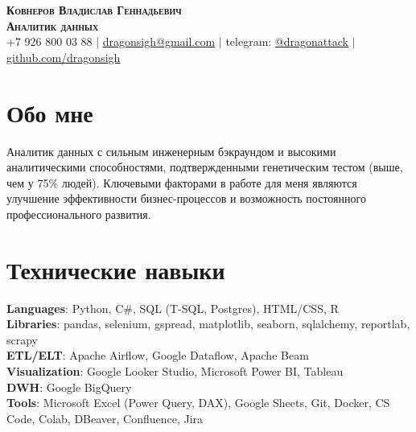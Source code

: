 \documentclass[letterpaper,11pt]{article}
\begin{document}

\begin{center}
    \textbf{\Large \scshape Ковнеров Владислав Геннадьевич} \\ \vspace{1pt}
    \textbf{\scshape Аналитик данных} \\ \vspace{1pt}
    \small +7 926 800 03 88 $|$ \href{mailto:dragonsigh@gmail.com}{\underline{dragonsigh@gmail.com}} $|$ 
    telegram: \href{https://t.me/dragonattack}{\underline{@dragonattack}} $|$
    \href{https://github.com/DragonSigh}{\underline{github.com/dragonsigh}}
\end{center}


 \section{Обо мне}
 \begin{itemize}[leftmargin=0.15in, label={}]
    \small{\item{
     {Аналитик данных с сильным инженерным бэкраундом и высокими аналитическими способностями, подтвержденными генетическим тестом (выше, чем у 75\% людей). Ключевыми факторами в работе для меня являются улучшение эффективности бизнес-процессов и возможность постоянного профессионального развития.}
    }}
 \end{itemize}


\section{Технические навыки}
 \begin{itemize}[leftmargin=0.15in, label={}]
    \small{\item{
     \textbf{Languages}{: Python, C\#, SQL (T-SQL, Postgres), HTML/CSS, R} \\
     \textbf{Libraries}{: pandas, selenium, gspread, matplotlib, seaborn, sqlalchemy, reportlab, scrapy} \\
     \textbf{ETL/ELT}{: Apache Airflow, Google Dataflow, Apache Beam} \\
     \textbf{Visualization}{: Google Looker Studio, Microsoft Power BI, Tableau} \\
     \textbf{DWH}{: Google BigQuery} \\
     \textbf{Tools}{: Microsoft Excel (Power Query, DAX), Google Sheets, Git, Docker, CS Code, Colab, DBeaver, Confluence, Jira} \\
    }}
 \end{itemize}
\end{document}
